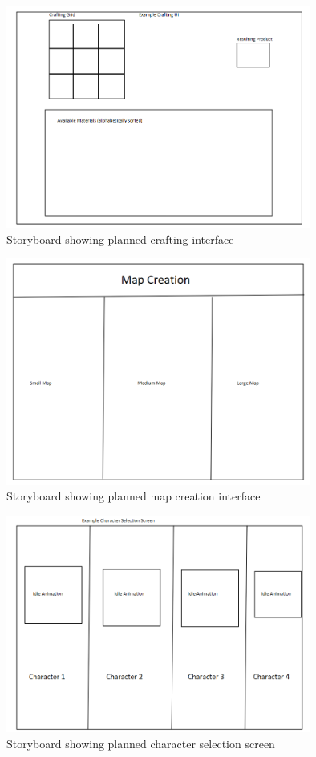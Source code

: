 \documentclass[12pt]{article}
\begin{document}
\begin{figure}[h]
    \centering
    \includegraphics[width = 10cm]{Storyboard3.PNG}
    \caption{Storyboard showing planned crafting interface}
\end{figure}
\begin{figure}[h]
    \centering
    \includegraphics[width = 10cm]{Storyboard4.PNG}
    \caption{Storyboard showing planned map creation interface}
\end{figure}
\begin{figure}[h]
    \centering
    \includegraphics[width = 10cm]{Storyboard5.PNG}
    \caption{Storyboard showing planned character selection screen}
\end{figure}
\end{document}
